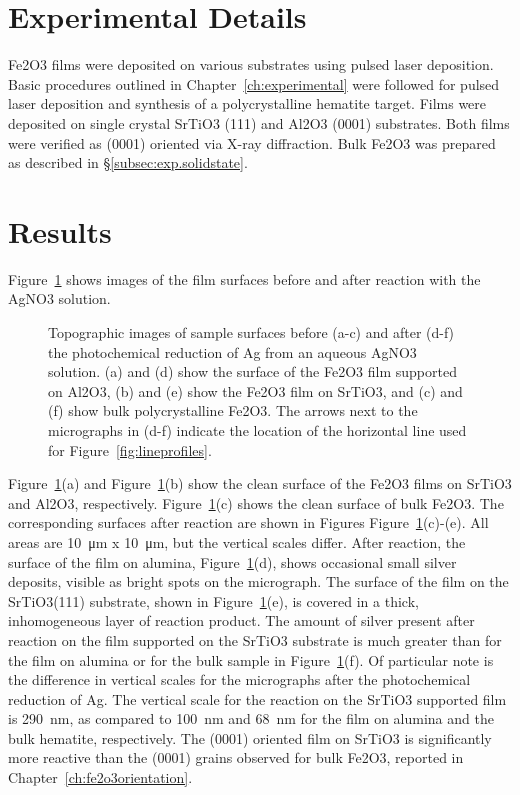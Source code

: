 \documentclass[12pt,%
              twoside,
               letterpaper]{uiothesis}
\begin{document}
 
\section{Experimental Details}
\label{sec:single.crystal.experimental}

 
Fe2O3 films were deposited on various substrates using pulsed laser deposition. Basic
procedures outlined in Chapter~\ref{ch:experimental} were followed for pulsed laser
deposition and synthesis of a polycrystalline hematite target. Films were deposited on
single crystal SrTiO3 (111) and Al2O3 (0001) substrates. Both films were
verified as (0001) oriented via X-ray diffraction. Bulk Fe2O3 was prepared as
described in \S \ref{subsec:exp.solidstate}.


\section{Results}
\label{sec:single.crystal.results}


Figure~\ref{fig:thinfilmresults} shows  images of the film surfaces before and after
reaction with the AgNO3 solution.  
\begin{figure}
	\caption[Images of thin film surfaces after reaction]{%
		Topographic  images of sample surfaces before (a-c) and 
		after (d-f) the photochemical reduction of Ag from an aqueous 
		AgNO3 solution. (a) and (d) show the surface of the 
		Fe2O3 film supported on Al2O3, (b) and (e) show 
		the Fe2O3 film on SrTiO3, and (c) and (f) show bulk 
		polycrystalline Fe2O3. The arrows next to the micrographs 
		in (d-f) indicate the location of the horizontal line used for 
		Figure~\ref{fig:lineprofiles}.}
	\label{fig:thinfilmresults}
\end{figure}
Figure~\ref{fig:thinfilmresults}(a) and Figure~\ref{fig:thinfilmresults}(b) show the clean surface
of the Fe2O3 films on SrTiO3 and Al2O3, respectively. 
Figure~\ref{fig:thinfilmresults}(c) shows the clean surface of bulk Fe2O3. The
corresponding surfaces after reaction are shown in Figures
Figure~\ref{fig:thinfilmresults}(c)-(e). All areas are \SI{10}{\micro\meter} x
\SI{10}{\micro\meter}, but the vertical scales differ. After reaction, the surface of the
film on alumina, Figure~\ref{fig:thinfilmresults}(d), shows occasional small silver deposits,
visible as bright spots on the micrograph.  The surface of the film on the
SrTiO3(111) substrate, shown in Figure~\ref{fig:thinfilmresults}(e), is covered in a
thick, inhomogeneous layer of reaction product.  The amount of silver present after
reaction on the film supported on the SrTiO3 substrate is much greater than for the
film on alumina or for the bulk sample in Figure~\ref{fig:thinfilmresults}(f).  Of particular
note is the difference in vertical scales for the micrographs after the photochemical
reduction of Ag.  The vertical scale for the reaction on the SrTiO3 supported film is
\SI{290}{\nano\meter}, as compared to \SI{100}{\nano\meter} and \SI{68}{\nano\meter} for
the film on alumina and the bulk hematite, respectively. The (0001) oriented film on
SrTiO3 is significantly more reactive than the (0001) grains observed for bulk
Fe2O3, reported in Chapter~\ref{ch:fe2o3orientation}.
\end{document}
